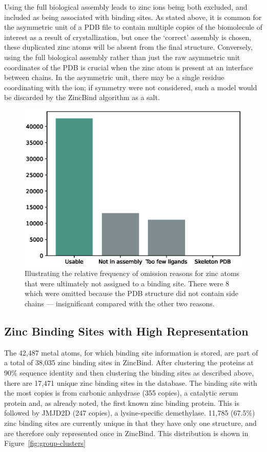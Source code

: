 Using the full biological assembly leads to zinc ions being both excluded, and included as being associated with binding sites. As stated above, it is common for the asymmetric unit of a PDB file to contain multiple copies of the biomolecule of interest as a result of crystallization, but once the `correct' assembly is chosen, these duplicated zinc atoms will be absent from the final structure. Conversely, using the full biological assembly rather than just the raw asymmetric unit coordinates of the PDB is crucial when the zinc atom is present at an interface between chains. In the asymmetric unit, there may be a single residue coordinating with the ion; if symmetry were not considered, such a model would be discarded by the ZincBind algorithm as a salt.

\begin{figure}
\centering
\includegraphics[width=1.0\textwidth]{Figures/omission.eps}
\caption[The relative frequency of omission reasons for zinc
atoms that were ultimately not assigned to a binding site.]{\label{fig:omission} Illustrating the relative frequency of omission reasons for zinc
atoms that were ultimately not assigned to a binding site. There were 8 which were omitted because
the PDB structure did not contain side chains --- insignificant compared with the other two reasons.}
\end{figure}

\subsection{Zinc Binding Sites with High Representation}

The 42,487 metal atoms, for which binding site information is stored, are part of a total of 38,035 zinc binding sites in ZincBind. After clustering the proteins at 90\% sequence identity and then clustering the binding sites as described above, there are 17,471 unique zinc binding sites in the database. The binding site with the most copies is from carbonic anhydrase (355 copies), a catalytic serum protein and, as already noted, the first known zinc binding protein. This is followed by JMJD2D (247 copies), a lysine-specific demethylase. 11,785 (67.5\%) zinc binding sites are currently unique in that they have only one structure, and are therefore only represented once in ZincBind. This distribution is shown in Figure~\ref{fig:group-clusters}

